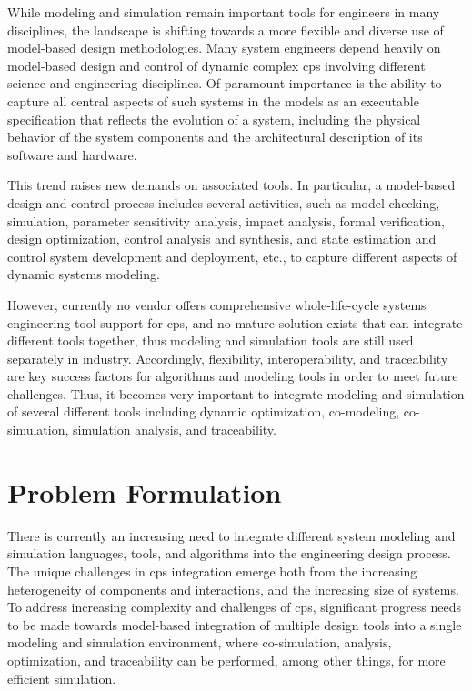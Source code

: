 While modeling and simulation remain important tools for engineers in many disciplines, the landscape is shifting towards a more flexible and diverse use of model-based design methodologies. Many system engineers depend heavily on model-based design and control of dynamic complex \acrshort{cps} involving different science and engineering disciplines. Of paramount importance is the ability to capture all central aspects of such systems in the models as an executable specification that reflects the evolution of a system, including the physical behavior of the system components and the architectural description of its software and hardware. 

This trend raises new demands on associated tools. In particular, a model-based design and control process includes several activities, such as model checking, simulation, parameter sensitivity analysis, impact analysis, formal verification, design optimization, control analysis and synthesis, and state estimation and control system development and deployment, etc., to capture different aspects of dynamic systems modeling.

However, currently no vendor offers comprehensive whole-life-cycle systems engineering tool support for \acrshort{cps}, and no mature solution exists that can integrate different tools together, thus modeling and simulation tools are still used separately in industry. Accordingly, flexibility, interoperability, and traceability are key success factors for algorithms and modeling tools in order to meet future challenges. Thus, it becomes very important to integrate modeling and simulation of several different tools including dynamic optimization, co-modeling, co-simulation, simulation analysis, and traceability.


\section{Problem Formulation}
\label{sec:Problem Formulation}

There is currently an increasing need to integrate different system modeling and simulation languages, tools, and algorithms into the engineering design process. The unique challenges in \acrshort{cps} integration emerge both from the increasing heterogeneity of components and interactions, and the increasing size of systems. To address increasing complexity and challenges of \acrshort{cps}, significant progress needs to be made towards model-based integration of multiple design tools into a single modeling and simulation environment, where co-simulation, analysis, optimization, and traceability can be performed, among other things, for more efficient simulation.

